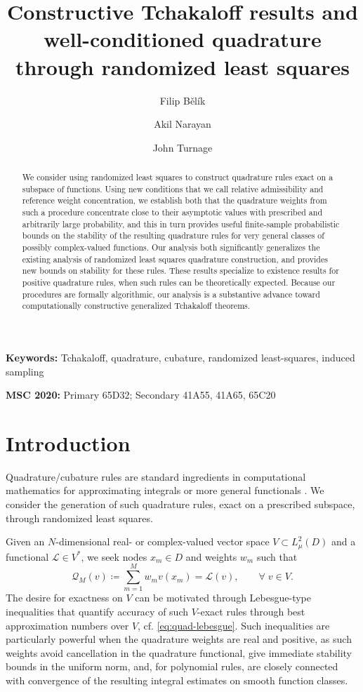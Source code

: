 \documentclass[10pt,dvipsnames]{amsart}
\title[Constructive Tchakaloff results and well-conditioned quadrature]{Constructive Tchakaloff results and well-conditioned quadrature through randomized least squares}
\author{Filip B\v{e}l\'ik}
\author{Akil Narayan}
\author{John Turnage}
\begin{document}
\begin{abstract}
We consider using randomized least squares to construct quadrature rules exact on a subspace of functions. Using new conditions that we call relative admissibility and reference weight concentration, we establish both that the quadrature weights from such a procedure concentrate close to their asymptotic values with prescribed and arbitrarily large probability, and this in turn provides useful finite-sample probabilistic bounds on the stability of the resulting quadrature rules for very general classes of possibly complex-valued functions. Our analysis both significantly generalizes the existing analysis of randomized least squares quadrature construction, and provides new bounds on stability for these rules. These results specialize to existence results for positive quadrature rules, when such rules can be theoretically expected. Because our procedures are formally algorithmic, our analysis is a substantive advance toward computationally constructive generalized Tchakaloff theorems.
\end{abstract}

\maketitle

{\footnotesize
\noindent \textbf{Keywords:}
Tchakaloff, quadrature, cubature, randomized least-squares, induced sampling

\noindent \textbf{MSC 2020:}
Primary 65D32; Secondary 41A55, 41A65, 65C20}

\section{Introduction}

Quadrature/cubature rules are standard ingredients in computational mathematics for approximating integrals or more general functionals \cite{Cools1997,Brass2011}. We consider the generation of such quadrature rules, exact on a prescribed subspace, through randomized least squares. 

Given an \(N\)-dimensional real- or complex-valued vector space \(V\subset L^2_\mu(D)\) and a functional
\(\mathcal L\in V^*\), we seek nodes \(x_m\in D\) and weights \(w_m\) such
that
\begin{equation}\label{eq:Q-L-exact}
  \mathcal{Q}_M(v) \coloneqq \sum_{m=1}^M w_m v(x_m)=\mathcal L(v),
    \qquad \forall\;v\in V.
\end{equation}
The desire for exactness on $V$ can be motivated through Lebesgue-type
inequalities that quantify accuracy of such $V$-exact rules through best
approximation numbers over $V$, cf. \eqref{eq:quad-lebesgue}. Such inequalities
are particularly powerful when the quadrature weights are real and positive,
as such weights avoid cancellation in the quadrature functional, give
immediate stability bounds in the uniform norm, and, for polynomial rules, are
closely connected with convergence of the resulting integral estimates on
smooth function classes.
\end{document}
